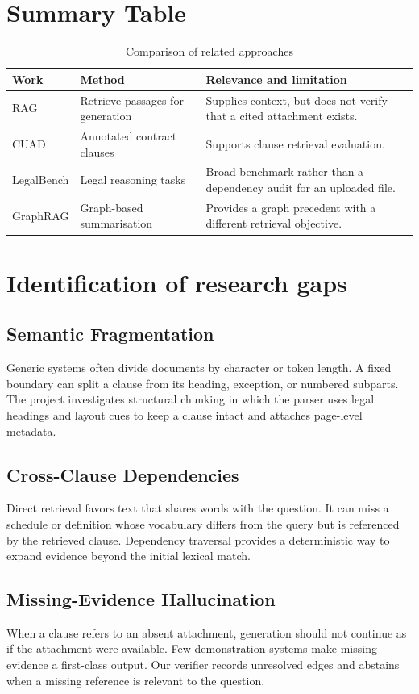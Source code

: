 \documentclass[12pt,a4paper,oneside]{report}
\begin{document}
\section{Summary Table}
\begin{table}[H]
\centering
\begin{tabularx}{\textwidth}{lXX}
\toprule
Work & Method & Relevance and limitation\\ \midrule
RAG \cite{lewis2020rag} & Retrieve passages for generation & Supplies context, but does not verify that a cited attachment exists.\\
CUAD \cite{hendrycks2021cuad} & Annotated contract clauses & Supports clause retrieval evaluation.\\
LegalBench \cite{guha2023legalbench} & Legal reasoning tasks & Broad benchmark rather than a dependency audit for an uploaded file.\\
GraphRAG \cite{edge2024graphrag} & Graph-based summarisation & Provides a graph precedent with a different retrieval objective.\\
\bottomrule
\end{tabularx}
\caption{Comparison of related approaches}
\end{table}
\section{Identification of research gaps}

\subsection{Semantic Fragmentation}
Generic systems often divide documents by character or token length. A fixed boundary can split a clause from its heading, exception, or numbered subparts. The project investigates structural chunking in which the parser uses legal headings and layout cues to keep a clause intact and attaches page-level metadata.

\subsection{Cross-Clause Dependencies}
Direct retrieval favors text that shares words with the question. It can miss a schedule or definition whose vocabulary differs from the query but is referenced by the retrieved clause. Dependency traversal provides a deterministic way to expand evidence beyond the initial lexical match.

\subsection{Missing-Evidence Hallucination}
When a clause refers to an absent attachment, generation should not continue as if the attachment were available. Few demonstration systems make missing evidence a first-class output. Our verifier records unresolved edges and abstains when a missing reference is relevant to the question.
\end{document}

